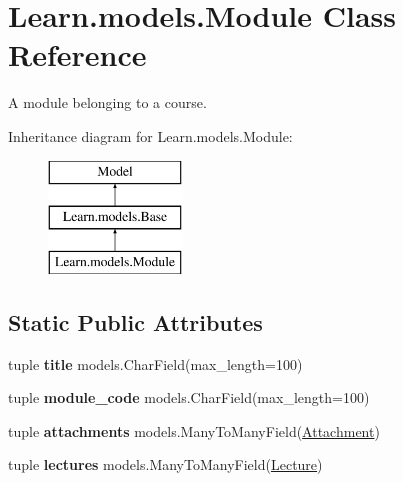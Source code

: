 \hypertarget{class_learn_1_1models_1_1_module}{\section{Learn.\-models.\-Module Class Reference}
\label{class_learn_1_1models_1_1_module}
}


A module belonging to a course.  


Inheritance diagram for Learn.\-models.\-Module\-:\begin{figure}[H]
\begin{center}
\leavevmode
\includegraphics[height=3.000000cm]{class_learn_1_1models_1_1_module}
\end{center}
\end{figure}
\subsection*{Static Public Attributes}
\begin{DoxyCompactItemize}
\item 
\hypertarget{class_learn_1_1models_1_1_module_a6681a4334338d2b737625c6f9919d47c}{tuple {\bfseries title} models.\-Char\-Field(max\-\_\-length=100)}\label{class_learn_1_1models_1_1_module_a6681a4334338d2b737625c6f9919d47c}

\item 
\hypertarget{class_learn_1_1models_1_1_module_ab8669b2e30cc2503f2b9c046b69fbf81}{tuple {\bfseries module\-\_\-code} models.\-Char\-Field(max\-\_\-length=100)}\label{class_learn_1_1models_1_1_module_ab8669b2e30cc2503f2b9c046b69fbf81}

\item 
\hypertarget{class_learn_1_1models_1_1_module_a0c8e0fa400f13699981bc68b73530c9a}{tuple {\bfseries attachments} models.\-Many\-To\-Many\-Field(\hyperlink{class_learn_1_1models_1_1_attachment}{Attachment})}\label{class_learn_1_1models_1_1_module_a0c8e0fa400f13699981bc68b73530c9a}

\item 
\hypertarget{class_learn_1_1models_1_1_module_a360e290c667908a5b0a792f5517ba53b}{tuple {\bfseries lectures} models.\-Many\-To\-Many\-Field(\hyperlink{class_learn_1_1models_1_1_lecture}{Lecture})}\label{class_learn_1_1models_1_1_module_a360e290c667908a5b0a792f5517ba53b}

\end{DoxyCompactItemize}
